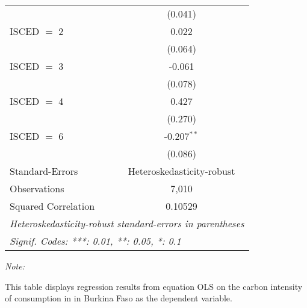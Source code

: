 \begin{table}[htbp!]
\begin{adjustbox}{width = 1\textwidth, max height = 0.95\textheight, center}
\begin{threeparttable}[b]
\begin{tabular}{lc}
                                & (0.041)\\   
            ISCED $=$ 2         & 0.022\\   
                                & (0.064)\\   
            ISCED $=$ 3         & -0.061\\   
                                & (0.078)\\   
            ISCED $=$ 4         & 0.427\\   
                                & (0.270)\\   
            ISCED $=$ 6         & -0.207$^{**}$\\   
                                & (0.086)\\   
            \midrule 
            Standard-Errors     & Heteroskedasticity-robust \\   
            Observations        & 7,010\\  
            Squared Correlation & 0.10529\\  
            \midrule \midrule
            \multicolumn{2}{l}{\emph{Heteroskedasticity-robust standard-errors in parentheses}}\\
            \multicolumn{2}{l}{\emph{Signif. Codes: ***: 0.01, **: 0.05, *: 0.1}}\\
         \end{tabular}
         
         \begin{tablenotes}\item \medskip \textit{Note:}
            \item This table displays regression results from equation OLS on the carbon intensity of consumption in  in Burkina Faso as the dependent variable. 
         \end{tablenotes}
      \end{threeparttable}
   \end{adjustbox}
\end{table}


